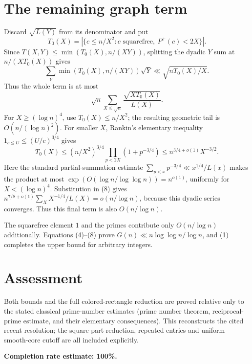 \documentclass[11pt]{article}
\begin{document}
\section*{The remaining graph term}
Discard $\sqrt{L(Y)}$ from its denominator and put
\[
 T_0(X)=|\{c\le n/X^2:c\text{ squarefree},\ P^+(c)<2X\}|.
\]
Since $T(X,Y)\le\min(T_0(X),n/(XY))$, splitting the dyadic $Y$ sum at $n/(XT_0(X))$ gives
\[
 \sum_Y\min(T_0(X),n/(XY))\sqrt Y\ll\sqrt{nT_0(X)/X}.
\]
Thus the whole term is at most
\[
 \sqrt n\sum_{X\le\sqrt n}\frac{\sqrt{XT_0(X)}}{L(X)}.\tag{8}
\]
For $X\ge(\log n)^4$, use $T_0(X)\le n/X^2$; the resulting geometric tail is $O(n/(\log n)^2)$. For smaller $X$, Rankin's elementary inequality $1_{c\le U}\le(U/c)^{3/4}$ gives
\[
 T_0(X)\le(n/X^2)^{3/4}\prod_{p<2X}(1+p^{-3/4})
 \le n^{3/4+o(1)}X^{-3/2}.
\]
Here the standard partial-summation estimate $\sum_{p<x}p^{-3/4}\ll x^{1/4}/L(x)$ makes the product at most $\exp(O(\log n/\log\log n))=n^{o(1)}$, uniformly for $X<(\log n)^4$. Substitution in (8) gives $n^{7/8+o(1)}\sum_X X^{-1/4}/L(X)=o(n/\log n)$, because this dyadic series converges. Thus this final term is also $O(n/\log n)$.

The squarefree element $1$ and the primes contribute only $O(n/\log n)$ additionally. Equations (4)--(8) prove $G(n)\ll n\log\log n/\log n$, and (1) completes the upper bound for arbitrary integers.

\section*{Assessment}
Both bounds and the full colored-rectangle reduction are proved relative only to the stated classical prime-number estimates (prime number theorem, reciprocal-prime estimate, and their elementary consequences). This reconstructs the cited recent resolution; the square-part reduction, repeated entries and uniform smooth-core cutoff are all included explicitly.

\textbf{Completion rate estimate: 100\%.}
\end{document}
